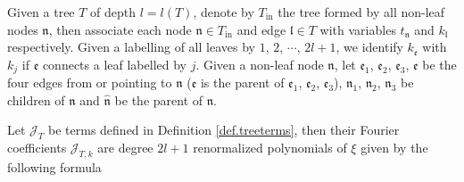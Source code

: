\begin{lem}\label{lem.treeterms} Given a tree $T$ of depth $l=l(T)$, denote by $T_{\text{in}}$ the tree formed by all non-leaf nodes $\mathfrak{n}$, then associate each node $\mathfrak{n}\in T_{\text{in}}$ and edge $\mathfrak{l}\in T$ with variables $t_{\mathfrak{n}}$ and $k_{\mathfrak{l}}$ respectively. Given a labelling of all leaves by $1$, $2$, $\cdots$, $2l+1$, we identify $k_{\mathfrak{e}}$ with $k_j$ if $\mathfrak{e}$ connects a leaf labelled by $j$. Given a non-leaf node $\mathfrak{n}$, let $\mathfrak{e}_1$, $\mathfrak{e}_2$, $\mathfrak{e}_3$, $\mathfrak{e}$ be the four edges from or pointing to $\mathfrak{n}$ ($\mathfrak{e}$ is the parent of $\mathfrak{e}_1$, $\mathfrak{e}_2$, $\mathfrak{e}_3$), $\mathfrak{n}_1$, $\mathfrak{n}_2$, $\mathfrak{n}_3$ be children of $\mathfrak{n}$ and $\hat{\mathfrak{n}}$ be the parent of $\mathfrak{n}$.

Let $\mathcal{J}_T$ be terms defined in Definition \ref{def.treeterms}, then their Fourier coefficients $\mathcal{J}_{T,k}$ are degree $2l+1$ renormalized polynomials of $\xi$ given by the following formula


\end{lem}
